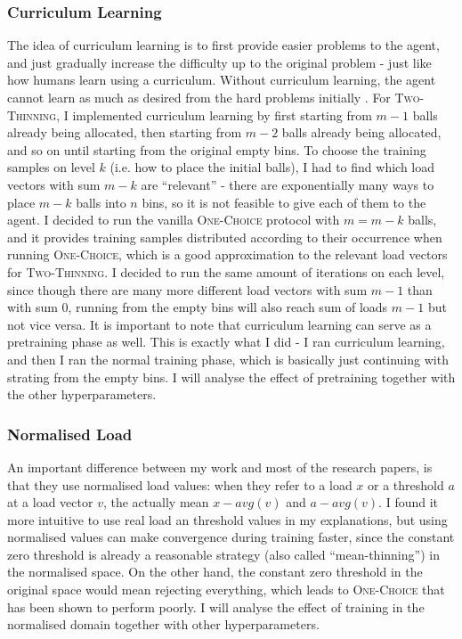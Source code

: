 \subsubsection{Curriculum Learning}



The idea of curriculum learning \cite{bengio2009curriculumoriginal} is to first provide easier problems to the agent, and just gradually increase the difficulty up to the original problem - just like how humans learn using a curriculum. Without curriculum learning, the agent cannot learn as much as desired from the hard problems initially . For \textsc{Two-Thinning}, I implemented curriculum learning by first starting from $m-1$ balls already being allocated, then starting from $m-2$ balls already being allocated, and so on until starting from the original empty bins. To choose the training samples on level $k$ (i.e. how to place the initial balls), I had to find which load vectors with sum $m-k$ are ``relevant'' - there are exponentially many ways to place $m-k$ balls into $n$ bins, so it is not feasible to give each of them to the agent. I decided to run the vanilla \textsc{One-Choice} protocol with $m=m-k$ balls, and it provides training samples distributed according to their occurrence when running \textsc{One-Choice}, which is a good approximation to the relevant load vectors for \textsc{Two-Thinning}. I decided to run the same amount of iterations on each level, since though there are many more different load vectors with sum $m-1$ than with sum $0$, running from the empty bins will also reach sum of loads $m-1$ but not vice versa. It is important to note that curriculum learning can serve as a pretraining phase as well. This is exactly what I did - I ran curriculum learning, and then I ran the normal training phase, which is basically just continuing with strating from the empty bins. I will analyse the effect of pretraining together with the other hyperparameters.




\subsubsection{Normalised Load}


An important difference between my work and most of the research papers, is that they use normalised load values: when they refer to a load $x$ or a threshold $a$ at a load vector $v$, the actually mean $x-avg(v)$ and $a-avg(v)$. I found it more intuitive to use real load an threshold values in my explanations, but using normalised values can make convergence during training faster, since the constant zero threshold is already a reasonable strategy (also called ``mean-thinning'') in the normalised space. On the other hand, the constant zero threshold in the original space would mean rejecting everything, which leads to \textsc{One-Choice} that has been shown to perform poorly. I will analyse the effect of training in the normalised domain together with other hyperparameters.


